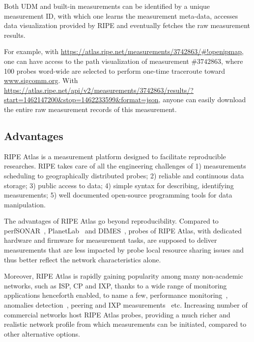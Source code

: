 Both \ac{UDM} and built-in measurements can be identified by a unique measurement ID, with which one learns the measurement meta-data, accesses data visualization provided by RIPE and eventually fetches the raw measurement results.

For example, with \url{https://atlas.ripe.net/measurements/3742863/#!openipmap}, one can have access to the path visualization of measurement $\#3742863$, where 100 probes word-wide are selected to perform one-time traceroute toward \url{www.sigcomm.org}. With \url{https://atlas.ripe.net/api/v2/measurements/3742863/results/?start=1462147200&stop=1462233599&format=json}, anyone can easily download the entire raw measurement records of this measurement.

\subsection{Advantages}
RIPE Atlas is a measurement platform designed to facilitate reproducible researches. RIPE takes care of all the engineering challenges of 1) measurements scheduling to geographically distributed probes; 2) reliable and continuous data storage; 3) public access to data; 4) simple syntax for describing, identifying measurements; 5) well documented open-source programming tools for data manipulation.

The advantages of RIPE Atlas go beyond reproducibility. Compared to perfSONAR~\cite{perfSONAR}, PlanetLab~\cite{PlanetLab} and DIMES~\cite{DIMES}, probes of RIPE Atlas, with dedicated hardware and firmware for measurement tasks, are supposed to deliver measurements that are less impacted by probe local resource sharing issues and thus better reflect the network characteristics alone.

Moreover, RIPE Atlas is rapidly gaining popularity among many non-academic networks, such as \ac{ISP}, \ac{CP} and \ac{IXP}, thanks to a wide range of monitoring applications henceforth enabled, to name a few, performance monitoring~\cite{latencymon, Rimondini2014}, anomalies detection~\cite{Fontugne2016, Padmanabhan, halo}, peering and IXP measurements~\cite{ixp, routeixp} etc. Increasing number of commercial networks host RIPE Atlas probes, providing a much richer and realistic network profile from which measurements can be initiated, compared to other alternative options.

